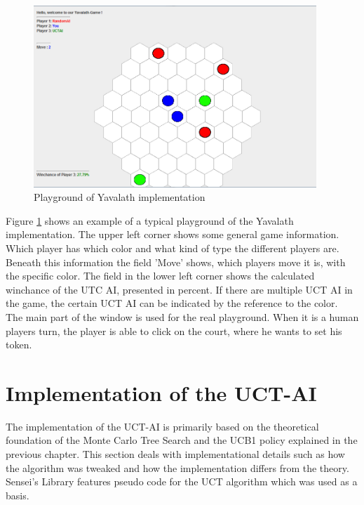 \documentclass[english]{report}
\begin{document}
\begin{figure}[ht]
\centering
\includegraphics[width=0.95\textwidth]{Abbildungen/exampleOfPlayGround.png}
\caption[Playground of Yavalath implementation]{Playground of Yavalath implementation}
\label{fig:playgroundOfYav}
\end{figure} 

\noindent Figure \ref{fig:playgroundOfYav} shows an example of a typical playground of the Yavalath implementation. 
The upper left corner shows some general game information. Which player has which color and what kind of type the different 
players are. Beneath this information the field 'Move' shows, which players move it is, with the specific color. The field in the 
lower left corner shows the calculated winchance of the UTC AI, presented in percent. If there are multiple UCT AI in the game, the 
certain UCT AI can be indicated by the reference to the color.  \\
The main part of the window is used for the real playground. When it is a human players turn, the player is able to click on the court, 
where he wants to set his 
token. 

\section{Implementation of the UCT-AI}
The implementation of the UCT-AI is primarily based on the theoretical
foundation of the Monte Carlo Tree Search and the UCB1 policy explained in the
previous chapter. This section deals with implementational details such as how
the algorithm was tweaked and how the implementation differs from the theory. 
Sensei's Library features pseudo code for the UCT algorithm which was used as a
basis.\cite{sl}
\end{document}
